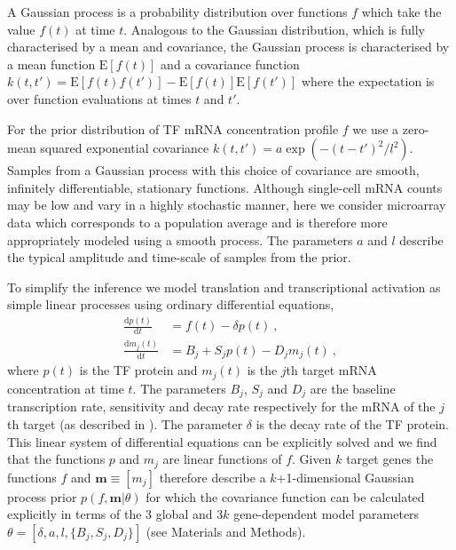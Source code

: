 \documentclass{pnastwo}
\begin{document}
\begin{article}
A Gaussian process is a probability distribution over
functions $f$ which take the value $f(t)$ at time
$t$. Analogous to the Gaussian distribution, which is fully
characterised by a mean and covariance, the Gaussian process is
characterised by a mean function $\mathrm{E}[f(t)]$ and a covariance
function $k(t,t')=\mathrm{E}[f(t)f(t')]-\mathrm{E}[f(t)]\mathrm{E}[f(t')]$
where the expectation is over function evaluations at times $t$ and
$t'$. 

For the prior distribution of TF mRNA concentration profile $f$ we use a zero-mean squared exponential covariance
$k(t,t')=a\exp(-(t-t')^2/l^2)$. Samples from a Gaussian process with this choice
of covariance are smooth, infinitely differentiable, stationary functions. Although single-cell mRNA counts may be low
and vary in a highly stochastic manner, here we consider microarray data which
corresponds to a population average and is therefore more
appropriately modeled using a smooth process. The parameters $a$ and
$l$ describe the typical amplitude and time-scale of samples from
the prior. 

To simplify the inference we model translation and transcriptional
activation as simple linear processes using ordinary differential
equations,
\begin{align}
  \frac{\mathrm{d}p(t)}{\mathrm{d}t} & = f(t) - \delta
  p(t) \ , \label{eq:translation_ode} \\
  \frac{\mathrm{d}m_j(t)}{\mathrm{d}t} & = B_j+S_j p(t)-D_j m_j(t) \ , \label{eq:transcription_ode}
\end{align}
where $p(t)$ is the TF protein and $m_j(t)$ is the $j$th target mRNA
concentration at time $t$. The parameters $B_j$, $S_j$ and $D_j$ are the
baseline transcription rate, sensitivity and decay rate respectively
for the mRNA of the $j$th target (as described in \cite{Barenco2006a}).
The parameter $\delta$ is the decay rate of the TF protein.
This linear system of differential equations can be
explicitly solved and we find that the functions $p$ and $m_j$ are
linear functions of $f$. Given $k$ target genes the functions $f$ and $\bm m\equiv[m_j]$ therefore
describe a $k$+1-dimensional Gaussian process prior $p(f,\bm m|\theta)$
for which the covariance function can be calculated explicitly in terms of the
$3$ global and $3k$ gene-dependent model parameters
$\theta=[\delta,a,l,\{B_j,S_j,D_j\}]$ (see Materials and Methods). 


\end{article}
\end{document}
